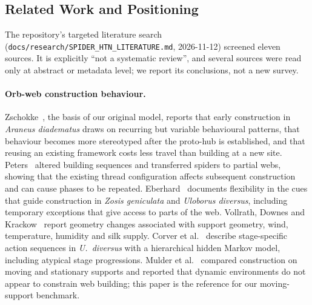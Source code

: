 \subsection{Related Work and Positioning}
\label{sec:record-related}

The repository's targeted literature search (\texttt{docs/\allowbreak{}research/\allowbreak{}SPIDER\_\allowbreak{}HTN\_\allowbreak{}LITERATURE.md},
2026-11-12) screened eleven sources. It is explicitly ``not a systematic review'', and several sources were
read only at abstract or metadata level; we report its conclusions, not a new survey.

\paragraph{Orb-web construction behaviour.}
Zschokke~\cite{zschokke1996early}, the basis of our original model, reports that early construction in
\emph{Araneus diadematus} draws on recurring but variable behavioural patterns, that behaviour becomes more
stereotyped after the proto-hub is established, and that reusing an existing framework costs less travel than
building at a new site. Peters~\cite{peters1970configuration} altered building sequences and transferred
spiders to partial webs, showing that the existing thread configuration affects subsequent construction and
can cause phases to be repeated. Eberhard~\cite{eberhard2019flexibility} documents flexibility in the cues
that guide construction in \emph{Zosis geniculata} and \emph{Uloborus diversus}, including temporary
exceptions that give access to parts of the web. Vollrath, Downes and Krackow~\cite{vollrath1997variability}
report geometry changes associated with support geometry, wind, temperature, humidity and silk supply.
Corver et al.~\cite{corver2021stages} describe stage-specific action sequences in \emph{U.~diversus} with a
hierarchical hidden Markov model, including atypical stage progressions. Mulder et
al.~\cite{mulder2021dynamic} compared construction on moving and stationary supports and reported that
dynamic environments do not appear to constrain web building; this paper is the reference for our
moving-support benchmark.


